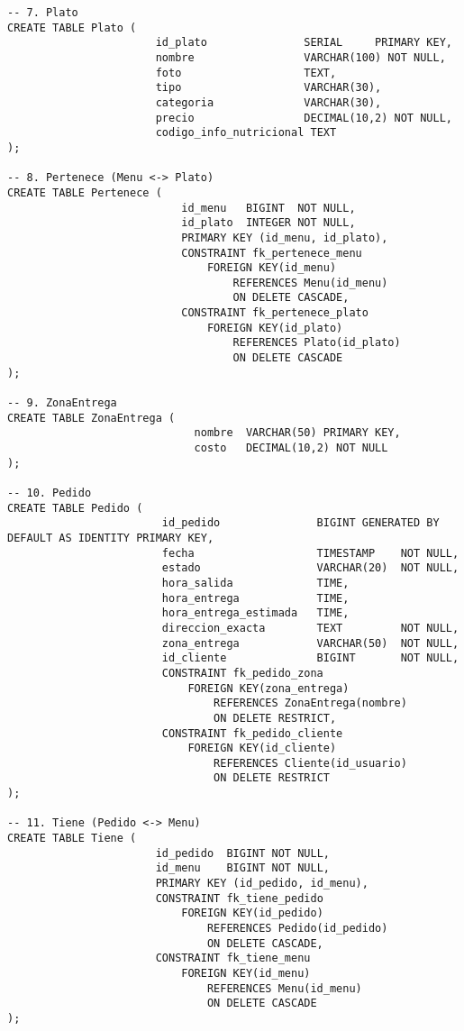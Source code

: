 \documentclass[12pt,a4paper]{article}
\begin{document}
\begin{lstlisting}
-- 7. Plato
CREATE TABLE Plato (
                       id_plato               SERIAL     PRIMARY KEY,
                       nombre                 VARCHAR(100) NOT NULL,
                       foto                   TEXT,
                       tipo                   VARCHAR(30),
                       categoria              VARCHAR(30),
                       precio                 DECIMAL(10,2) NOT NULL,
                       codigo_info_nutricional TEXT
);

-- 8. Pertenece (Menu <-> Plato)
CREATE TABLE Pertenece (
                           id_menu   BIGINT  NOT NULL,
                           id_plato  INTEGER NOT NULL,
                           PRIMARY KEY (id_menu, id_plato),
                           CONSTRAINT fk_pertenece_menu
                               FOREIGN KEY(id_menu)
                                   REFERENCES Menu(id_menu)
                                   ON DELETE CASCADE,
                           CONSTRAINT fk_pertenece_plato
                               FOREIGN KEY(id_plato)
                                   REFERENCES Plato(id_plato)
                                   ON DELETE CASCADE
);

-- 9. ZonaEntrega
CREATE TABLE ZonaEntrega (
                             nombre  VARCHAR(50) PRIMARY KEY,
                             costo   DECIMAL(10,2) NOT NULL
);

-- 10. Pedido
CREATE TABLE Pedido (
                        id_pedido               BIGINT GENERATED BY DEFAULT AS IDENTITY PRIMARY KEY,
                        fecha                   TIMESTAMP    NOT NULL,
                        estado                  VARCHAR(20)  NOT NULL,
                        hora_salida             TIME,
                        hora_entrega            TIME,
                        hora_entrega_estimada   TIME,
                        direccion_exacta        TEXT         NOT NULL,
                        zona_entrega            VARCHAR(50)  NOT NULL,
                        id_cliente              BIGINT       NOT NULL,
                        CONSTRAINT fk_pedido_zona
                            FOREIGN KEY(zona_entrega)
                                REFERENCES ZonaEntrega(nombre)
                                ON DELETE RESTRICT,
                        CONSTRAINT fk_pedido_cliente
                            FOREIGN KEY(id_cliente)
                                REFERENCES Cliente(id_usuario)
                                ON DELETE RESTRICT
);

-- 11. Tiene (Pedido <-> Menu)
CREATE TABLE Tiene (
                       id_pedido  BIGINT NOT NULL,
                       id_menu    BIGINT NOT NULL,
                       PRIMARY KEY (id_pedido, id_menu),
                       CONSTRAINT fk_tiene_pedido
                           FOREIGN KEY(id_pedido)
                               REFERENCES Pedido(id_pedido)
                               ON DELETE CASCADE,
                       CONSTRAINT fk_tiene_menu
                           FOREIGN KEY(id_menu)
                               REFERENCES Menu(id_menu)
                               ON DELETE CASCADE
);


\end{lstlisting}
\end{document}
